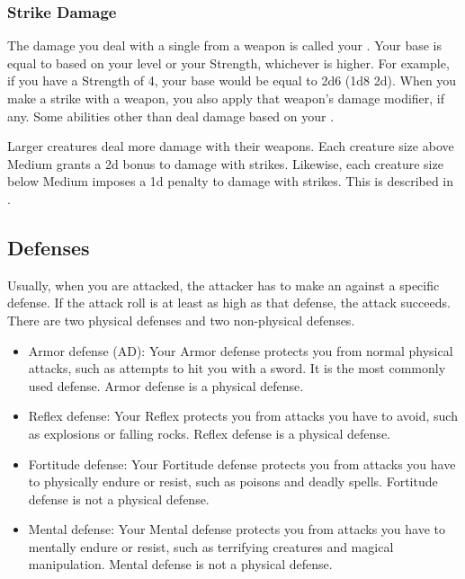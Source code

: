         \subsubsection{Strike Damage}\label{Strike Damage}
            The damage you deal with a single  from a weapon is called your .
            Your base  is equal to  based on your level or your Strength, whichever is higher.
            For example, if you have a Strength of 4, your base  would be equal to 2d6 (1d8 \plus2d).
            When you make a strike with a weapon, you also apply that weapon's damage modifier, if any.
            Some abilities other than  deal damage based on your .

            \label{Creature Size and Damage}
            Larger creatures deal more damage with their weapons.
            Each creature size above Medium grants a \plus2d bonus to damage with strikes.
            Likewise, each creature size below Medium imposes a \minus1d penalty to damage with strikes.
            This is described in .

    \subsection{Defenses}\label{Defenses}
        Usually, when you are attacked, the attacker has to make an  against a specific defense.
        If the attack roll is at least as high as that defense, the attack succeeds.
        There are two physical defenses and two non-physical defenses.
        \begin{itemize}
            \item Armor defense (AD): Your Armor defense protects you from normal physical attacks, such as attempts to hit you with a sword.
                It is the most commonly used defense.
                Armor defense is a physical defense.
            \item Reflex defense: Your Reflex protects you from attacks you have to avoid, such as explosions or falling rocks.
                Reflex defense is a physical defense.
            \item Fortitude defense: Your Fortitude defense protects you from attacks you have to physically endure or resist, such as poisons and deadly spells.
                Fortitude defense is not a physical defense.
            \item Mental defense: Your Mental defense protects you from attacks you have to mentally endure or resist, such as terrifying creatures and magical manipulation.
                Mental defense is not a physical defense.
        \end{itemize}

